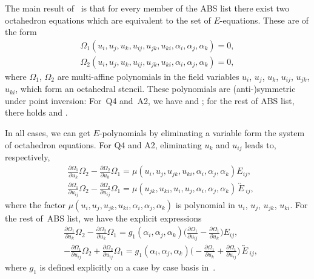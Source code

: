 \documentclass[10pt,a4paper]{amsart}
\newcommand{\inversion}[1]{\!\overleftrightarrow{\,#1\,}\!}
\newcommand{\pdv}[2]{\frac{\partial {#1}}{\partial {#2}}}
\numberwithin{equation}{section}
\begin{document}
The main result of~\cite{boll2016integrability} is that for every member of the ABS list there exist two octahedron equations which are equivalent to the set of $E$-equations. These are of the form
\begin{align*}
 \Omega_1(u_i,u_j,u_k,u_{ij}, u_{jk},u_{ki}, \alpha_i,\alpha_j,\alpha_k) = 0 , \\
 \Omega_2(u_i,u_j,u_k,u_{ij}, u_{jk},u_{ki},\alpha_i,\alpha_j,\alpha_k) = 0 ,
\end{align*}
where $\Omega_1$, $\Omega_2$ are multi-affine polynomials in the field variables $u_i$, $u_j$, $u_k$, $u_{ij}$, $u_{jk}$, $u_{ki}$, which form an octahedral stencil. These polynomials are (anti-)symmetric under point inversion:
For~Q4 and~A2, we have \smash{$\inversion \Omega_1 = \Omega_1$} and \smash{$\inversion \Omega_2 = \Omega_2$}; for the rest of ABS list, there holds \smash{$\inversion \Omega_1 = -\Omega_1$} and \smash{$\inversion \Omega_2 = \Omega_2$}.

In all cases, we can get $E$-polynomials by eliminating a variable form the system of octahedron equations. For Q4 and A2, eliminating $u_{k}$ and $u_{ij}$ leads to, respectively,
\begin{align}
 &\pdv{\Omega_1}{u_k} \Omega_2 - \pdv{\Omega_2}{u_k} \Omega_1 = \mu(u_i,u_j,u_{jk},u_{ki},\alpha_i,\alpha_j,\alpha_k) E_{ij} , \nonumber \\
 &\pdv{\Omega_1}{u_{ij}} \Omega_2 - \pdv{\Omega_2}{u_{ij}} \Omega_1 = \mu(u_{jk},u_{ki},u_i,u_j,\alpha_i,\alpha_j,\alpha_k) \inversion E_{ij} ,\label{Omegas-mu-E}
\end{align}
where the factor $\mu(u_i,u_j,u_{jk},u_{ki},\alpha_i,\alpha_j,\alpha_k)$ is polynomial in $u_i$, $u_j$, $u_{jk}$, $u_{ki}$.
For the rest of~ABS list, we have the explicit expressions
\begin{align}
 &\pdv{\Omega_1}{u_k} \Omega_2 - \pdv{\Omega_2}{u_k} \Omega_1 = g_1(\alpha_i,\alpha_j,\alpha_k) \biggl( \pdv{\Omega_1}{u_{ij}} - \pdv{\Omega_1}{u_k} \biggr) E_{ij} , \nonumber\\
 &-\pdv{\Omega_1}{u_{ij}} \Omega_2 + \pdv{\Omega_2}{u_{ij}} \Omega_1 = g_1(\alpha_i,\alpha_j,\alpha_k) \biggl( -\pdv{\Omega_1}{u_{k}} + \pdv{\Omega_1}{u_{ij}} \biggr) \inversion E_{ij} ,\label{Omegas-explicit-E}
\end{align}
where $g_1$ is defined explicitly on a case by case basis in~\cite[Proposition 5.3]{boll2016integrability}.
\end{document}
